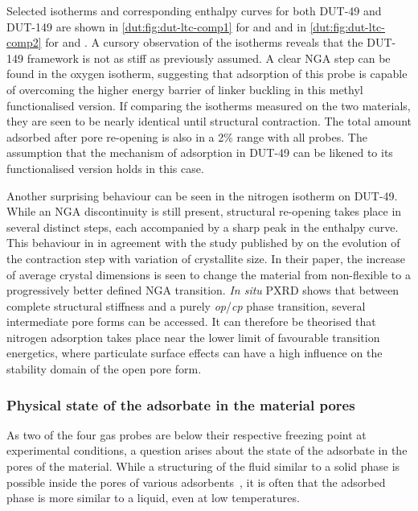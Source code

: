 Selected isotherms and corresponding enthalpy curves for both 
DUT-49 and DUT-149 are shown in \autoref{dut:fig:dut-ltc-comp1}
for  and  and in \autoref{dut:fig:dut-ltc-comp2}
for  and . A cursory observation of the isotherms
reveals that the DUT-149 framework is not as stiff as 
previously assumed. A clear NGA step can be found in the 
oxygen isotherm, suggesting that adsorption of this probe is capable 
of overcoming the higher energy barrier of linker buckling in 
this methyl functionalised version.
If comparing the isotherms measured on the two materials, they
are seen to be nearly identical until structural contraction.
The total amount adsorbed after pore re-opening is also in a 
2\% range with all probes. The assumption that the mechanism 
of adsorption in DUT-49 can be likened to its functionalised
version holds in this case.

Another surprising behaviour
can be seen in the nitrogen isotherm on DUT-49. While an NGA
discontinuity is still present, structural re-opening takes
place in several distinct steps, each accompanied by a sharp 
peak in the enthalpy curve. This behaviour in in
agreement with the study published by 
 \citet{krauseEffectCrystalliteSize2018}
on the evolution of the contraction step with variation of 
crystallite size. In their paper, the increase of average 
crystal dimensions is seen to change the material from non-flexible 
to a progressively better defined NGA transition. \textit{In situ} 
PXRD shows that between complete structural stiffness and a 
purely \textit{op}/\textit{cp} phase transition, several intermediate 
pore forms can be accessed. It can therefore be theorised that 
nitrogen adsorption takes place near the lower limit of 
favourable transition energetics, where particulate surface 
effects can have a high influence on the stability domain of
the open pore form.

\subsubsection{Physical state of the adsorbate in the material pores}

As two of the four gas probes are below their respective freezing point
at experimental conditions, a question arises about the state of
the adsorbate in the pores of the material. While a structuring of
the fluid similar to a solid phase is possible inside the 
pores of various adsorbents~\cite{llewellynAdsorptionMFItypeZeolites1993a},
it is often that the adsorbed phase is more similar to a liquid,
even at low temperatures.

